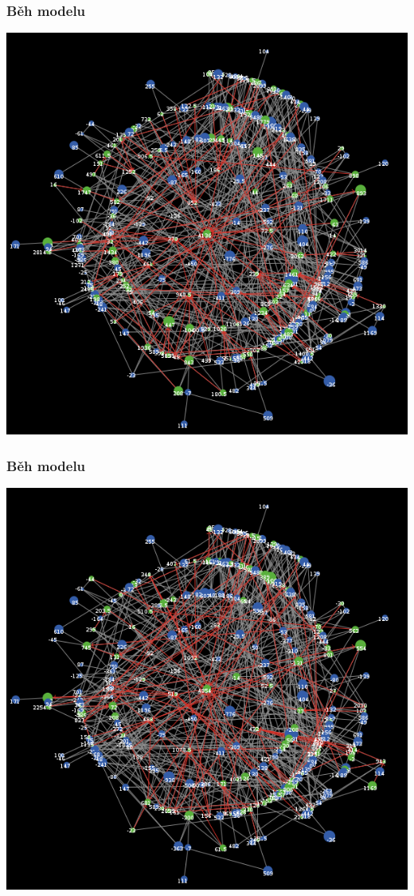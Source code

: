 \documentclass[xcolor=dvipsnames]{beamer}
\begin{document}
  \begin{frame}
    \frametitle{Běh modelu}
    \includegraphics[width=0.6\paperwidth]{12.png}
  \end{frame}
    \begin{frame}
    \frametitle{Běh modelu}
    \includegraphics[width=0.6\paperwidth]{13.png}
  \end{frame}
\end{document}
